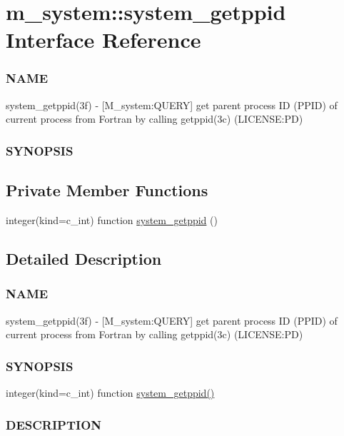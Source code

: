 \hypertarget{interfacem__system_1_1system__getppid}{}\section{m\+\_\+system\+:\+:system\+\_\+getppid Interface Reference}
\label{interfacem__system_1_1system__getppid}


\subsubsection*{N\+A\+ME}

system\+\_\+getppid(3f) -\/ \mbox{[}M\+\_\+system\+:Q\+U\+E\+RY\mbox{]} get parent process ID (P\+P\+ID) of current process from Fortran by calling getppid(3c) (L\+I\+C\+E\+N\+SE\+:PD) \subsubsection*{S\+Y\+N\+O\+P\+S\+IS} 


\subsection*{Private Member Functions}
\begin{DoxyCompactItemize}
\item 
integer(kind=c\+\_\+int) function \mbox{\hyperlink{interfacem__system_1_1system__getppid_af6e12ecb746ff59fbe323d9364db41b0}{system\+\_\+getppid}} ()
\end{DoxyCompactItemize}


\subsection{Detailed Description}
\subsubsection*{N\+A\+ME}

system\+\_\+getppid(3f) -\/ \mbox{[}M\+\_\+system\+:Q\+U\+E\+RY\mbox{]} get parent process ID (P\+P\+ID) of current process from Fortran by calling getppid(3c) (L\+I\+C\+E\+N\+SE\+:PD) \subsubsection*{S\+Y\+N\+O\+P\+S\+IS}

integer(kind=c\+\_\+int) function \mbox{\hyperlink{interfacem__system_1_1system__getppid_af6e12ecb746ff59fbe323d9364db41b0}{system\+\_\+getppid()}} \subsubsection*{D\+E\+S\+C\+R\+I\+P\+T\+I\+ON}

